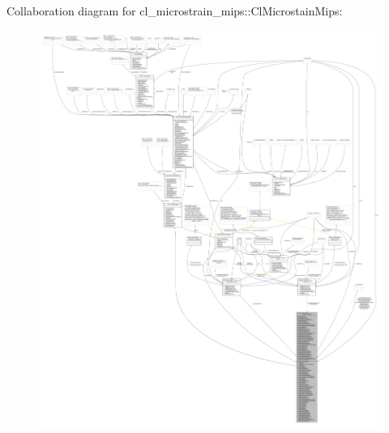 Collaboration diagram for cl\+\_\+microstrain\+\_\+mips\+:\+:Cl\+Microstain\+Mips\+:
\nopagebreak
\begin{figure}[H]
\begin{center}
\leavevmode
\includegraphics[width=350pt]{classcl__microstrain__mips_1_1ClMicrostainMips__coll__graph}
\end{center}
\end{figure}
